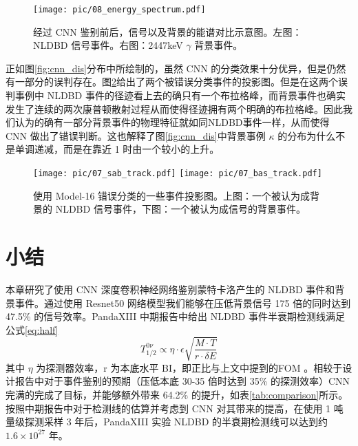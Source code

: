 \begin{figure}
    \centering
    \texttt{[image: pic/08\_energy\_spectrum.pdf]}
    \caption{经过 CNN 鉴别前后，信号以及背景的能谱对比示意图。左图：NLDBD 信号事件。右图：2447keV $\gamma$ 背景事件。}
    \label{fig:cnn_specturm}
\end{figure}

正如图\ref{fig:cnn_dis}分布中所绘制的，虽然 CNN 的分类效果十分优异，但是仍然有一部分的误判存在。图\ref{fig:wrong_judge}给出了两个被错误分类事件的投影图。但是在这两个误判事例中 NLDBD 事件的径迹看上去的确只有一个布拉格峰，而背景事件也确实发生了连续的两次康普顿散射过程从而使得径迹拥有两个明确的布拉格峰。因此我们认为的确有一部分背景事件的物理特征就如同NLDBD事件一样，从而使得 CNN 做出了错误判断。这也解释了图\ref{fig:cnn_dis}中背景事例 $\kappa$ 的分布为什么不是单调递减，而是在靠近 1 时由一个较小的上升。

\begin{figure}
    \centering
    \texttt{[image: pic/07\_sab\_track.pdf]}
    \texttt{[image: pic/07\_bas\_track.pdf]}
    \caption{使用 Model-16 错误分类的一些事件投影图。上图：一个被认为成背景的 NLDBD 信号事件，下图：一个被认为成信号的背景事件。}
    \label{fig:wrong_judge}
\end{figure}

\section{小结}

本章研究了使用 CNN 深度卷积神经网络鉴别蒙特卡洛产生的 NLDBD 事件和背景事件。通过使用 Resnet50 网络模型我们能够在压低背景信号 175 倍的同时达到 47.5\% 的信号效率。PandaXIII 中期报告中给出 NLDBD 事件半衰期检测线满足公式\ref{eq:half}\supercite{cdr}
\begin{equation}
    T_{1/2}^{0\nu}\propto\eta\cdot\epsilon\sqrt{\frac{M\cdot T}{r\cdot\delta E}}
    \label{eq:half}
\end{equation}
其中 $\eta$ 为探测器效率，r 为本底水平 BI，即正比与上文中提到的FOM 。相较于设计报告中对于事件鉴别的预期（压低本底 30-35 倍时达到 35\% 的探测效率）CNN 完满的完成了目标，并能够额外带来 64.2\% 的提升，如表\ref{tab:comparison}所示。按照中期报告中对于检测线的估算并考虑到 CNN 对其带来的提高，在使用 1 吨量级探测采样 3 年后，PandaXIII 实验 \xeots NLDBD 的半衰期检测线可以达到约 $1.6\times10^{27}$ 年。

